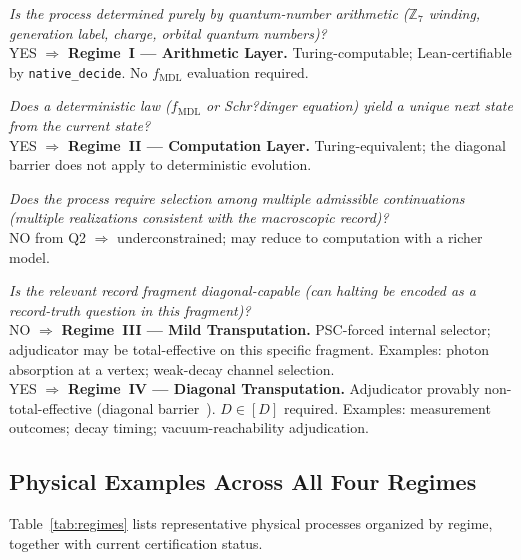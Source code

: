\documentclass[12pt,letterpaper]{article}
\newcommand{\fmdl}{f_{\mathrm{MDL}}}
\newcommand{\Zseven}{\mathbb{Z}_7}
\newcommand{\Dclass}{[D]}
\begin{document}
\begin{description}[leftmargin=2em, itemsep=5pt]
  \item[\normalfont\textbf{Q1:}] \emph{Is the process determined purely by
    quantum-number arithmetic ($\Zseven$ winding, generation label, charge,
    orbital quantum numbers)?} \\
    YES $\Rightarrow$ \textbf{Regime~I --- Arithmetic Layer.}  Turing-computable;
    Lean-certifiable by \texttt{native\_decide}.  No $\fmdl$ evaluation required.

  \item[\normalfont\textbf{Q2:}] \emph{Does a deterministic law ($\fmdl$ or
    Schr?dinger equation) yield a unique next state from the current state?} \\
    YES $\Rightarrow$ \textbf{Regime~II --- Computation Layer.}
    Turing-equivalent; the diagonal barrier does not apply to deterministic
    evolution.

  \item[\normalfont\textbf{Q3:}] \emph{Does the process require selection among
    multiple admissible continuations (multiple realizations consistent with the
    macroscopic record)?} \\
    NO from Q2 $\Rightarrow$ underconstrained; may reduce to computation with
    a richer model.

  \item[\normalfont\textbf{Q4:}] \emph{Is the relevant record fragment
    diagonal-capable (can halting be encoded as a record-truth question in this
    fragment)?} \\
    NO $\Rightarrow$ \textbf{Regime~III --- Mild Transputation.}  PSC-forced
    internal selector; adjudicator may be total-effective on this specific
    fragment.  Examples: photon absorption at a vertex; weak-decay channel
    selection. \\
    YES $\Rightarrow$ \textbf{Regime~IV --- Diagonal Transputation.}
    Adjudicator provably non-total-effective (diagonal barrier~\cite{SpivackNEMS11}).
    $D \in \Dclass$ required.  Examples: measurement outcomes; decay timing;
    vacuum-reachability adjudication.
\end{description}

\subsection{Physical Examples Across All Four Regimes}
\label{sec:examples}

Table~\ref{tab:regimes} lists representative physical processes organized by
regime, together with current certification status.
\end{document}
